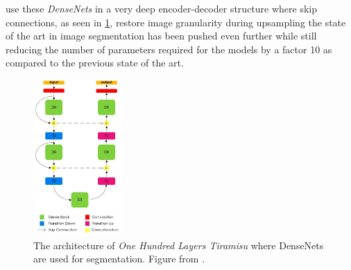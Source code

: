\documentclass{kththesis}
\begin{document}
\textcite{jegou2017one} use these \emph{DenseNets} in a very deep encoder-decoder
structure where skip connections, as seen in \cref{fig:Tiramisu}, restore image granularity during upsampling the
state of the art in image segmentation has been pushed even further while still reducing the number of parameters required
for the models by a factor 10 as compared to the previous state of the art. 

\begin{figure}[h]
  \centering
  \includegraphics[width=0.3\textwidth]{Tiramisu}
  \caption{The architecture of \textit{One Hundred Layers Tiramisu} where
    DenseNets are used for segmentation. Figure from \textcite[]{jegou2017one}.}
  \label{fig:Tiramisu}
  \end{figure}
\end{document}
